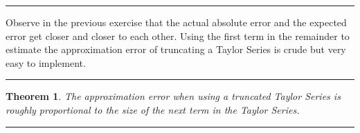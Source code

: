 \documentclass[
]{book}
\newtheorem{theorem}{Theorem}[chapter]
\theoremstyle{definition}
\theoremstyle{definition}
\theoremstyle{definition}
\theoremstyle{remark}
\begin{document}
\begin{center}\rule{0.5\linewidth}{0.5pt}\end{center}

Observe in the previous exercise that the actual absolute error and the expected error get closer and closer to each other. Using the first term in the remainder to estimate the approximation error of truncating a Taylor Series is crude but very easy to implement.

\begin{center}\rule{0.5\linewidth}{0.5pt}\end{center}

\begin{theorem}
\protect\hypertarget{thm:unnamed-chunk-48}{}{\label{thm:unnamed-chunk-48} }The approximation error when using a truncated Taylor Series is roughly proportional to the size of the next term in the Taylor Series.
\end{theorem}

\begin{center}\rule{0.5\linewidth}{0.5pt}\end{center}
\end{document}
